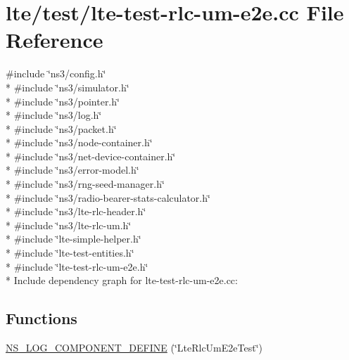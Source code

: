 \hypertarget{lte-test-rlc-um-e2e_8cc}{}\section{lte/test/lte-\/test-\/rlc-\/um-\/e2e.cc File Reference}
\label{lte-test-rlc-um-e2e_8cc}
{\ttfamily \#include \char`\"{}ns3/config.\+h\char`\"{}}\\*
{\ttfamily \#include \char`\"{}ns3/simulator.\+h\char`\"{}}\\*
{\ttfamily \#include \char`\"{}ns3/pointer.\+h\char`\"{}}\\*
{\ttfamily \#include \char`\"{}ns3/log.\+h\char`\"{}}\\*
{\ttfamily \#include \char`\"{}ns3/packet.\+h\char`\"{}}\\*
{\ttfamily \#include \char`\"{}ns3/node-\/container.\+h\char`\"{}}\\*
{\ttfamily \#include \char`\"{}ns3/net-\/device-\/container.\+h\char`\"{}}\\*
{\ttfamily \#include \char`\"{}ns3/error-\/model.\+h\char`\"{}}\\*
{\ttfamily \#include \char`\"{}ns3/rng-\/seed-\/manager.\+h\char`\"{}}\\*
{\ttfamily \#include \char`\"{}ns3/radio-\/bearer-\/stats-\/calculator.\+h\char`\"{}}\\*
{\ttfamily \#include \char`\"{}ns3/lte-\/rlc-\/header.\+h\char`\"{}}\\*
{\ttfamily \#include \char`\"{}ns3/lte-\/rlc-\/um.\+h\char`\"{}}\\*
{\ttfamily \#include \char`\"{}lte-\/simple-\/helper.\+h\char`\"{}}\\*
{\ttfamily \#include \char`\"{}lte-\/test-\/entities.\+h\char`\"{}}\\*
{\ttfamily \#include \char`\"{}lte-\/test-\/rlc-\/um-\/e2e.\+h\char`\"{}}\\*
Include dependency graph for lte-\/test-\/rlc-\/um-\/e2e.cc\+:
\subsection*{Functions}
\begin{DoxyCompactItemize}
\item 
\hyperlink{lte-test-rlc-um-e2e_8cc_a989cac67f206a9b0207e27553f0271fd}{N\+S\+\_\+\+L\+O\+G\+\_\+\+C\+O\+M\+P\+O\+N\+E\+N\+T\+\_\+\+D\+E\+F\+I\+NE} (\char`\"{}Lte\+Rlc\+Um\+E2e\+Test\char`\"{})
\end{DoxyCompactItemize}
